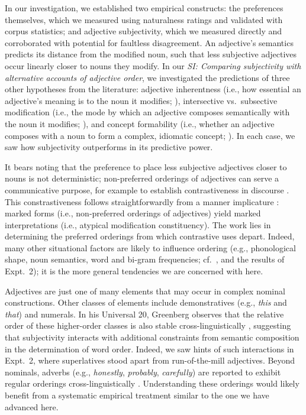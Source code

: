 \documentclass[12pt]{article}
\begin{document}
In our investigation, we established two empirical constructs: the preferences themselves, which we measured using naturalness ratings and validated with corpus statistics; and adjective subjectivity, which we measured directly and corroborated with potential for faultless disagreement. 
An adjective's semantics predicts its distance from the modified noun, such that less subjective adjectives occur linearly closer to nouns they modify. In our \textit{SI: Comparing subjectivity with alternative accounts of adjective order}, we investigated the predictions of three other hypotheses from the literature: adjective inherentness (i.e., how essential an adjective's meaning is to the noun it modifies; \citealp{sweet1898,whorf1945}), intersective vs.~subsective modification (i.e., the mode by which an adjective composes semantically with the noun it modifies; \citealp{truswell2009}), and concept formability (i.e., whether an adjective composes with a noun to form a complex, idiomatic concept; \citealp{McNally2004,bouchard2005,svenonius2008}). In each case, we saw how subjectivity outperforms in its predictive power.

It bears noting that the preference to place less subjective adjectives closer to nouns is not deterministic; non-preferred orderings of adjectives can serve a communicative purpose, for example to establish contrastiveness in discourse \citep{martin1969,Martin1970,Hill1958,vendler1963}. This constrastiveness follows straightforwardly from a manner implicature \citep{levinson2000}: marked forms (i.e., non-preferred orderings of adjectives) yield marked interpretations (i.e., atypical modification constituency). The work lies in determining the preferred orderings from which  contrastive uses depart. Indeed, many other situational factors are likely to influence ordering (e.g., phonological shape, noun semantics, word and bi-gram frequencies; cf.~\citealp{wulff2003}, and the results of Expt.~2); it is the more general tendencies we are concerned with here.

Adjectives are just one of many elements that may occur in complex nominal constructions. Other classes of elements include demonstratives (e.g., \emph{this} and \emph{that}) and numerals. In his Universal 20, Greenberg observes that the relative order of these higher-order classes is also stable cross-linguistically \citep{greenberg1963,Culbertson2014}, suggesting that subjectivity interacts with additional constraints from semantic composition in the determination of word order. Indeed, we saw hints of such interactions in Expt.~2, where superlatives stood apart from run-of-the-mill adjectives. Beyond nominals, adverbs (e.g., \emph{honestly}, \emph{probably}, \emph{carefully}) are reported to exhibit regular orderings cross-linguistically \citep{cinque1999,ernst2002}. Understanding these orderings would likely benefit from a systematic empirical treatment similar to the one we have advanced here.
\end{document}
